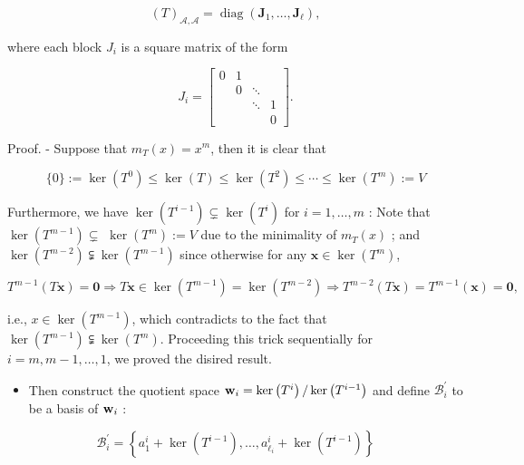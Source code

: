\documentclass[11pt]{article}
\begin{document}
\[
{\left( T\right) }_{\mathcal{A},\mathcal{A}} = \operatorname{diag}\left( {{\mathbf{J}}_1,\ldots ,{\mathbf{J}}_{\ell }}\right) ,
\]

where each block \({J}_{i}\) is a square matrix of the form

\[
{J}_{i} = \left\lbrack  \begin{matrix} 0 & 1 & & \\   & 0 &  \ddots  & \\   & &  \ddots  & 1 \\   & & & 0 \end{matrix}\right\rbrack  .
\]

Proof. - Suppose that \({m}_{T}\left( x\right)  = {x}^{m}\), then it is clear that

\[
\{ 0\}  \mathrel{\text{ := }} \ker \left( {T}^{0}\right)  \leq  \ker \left( T\right)  \leq  \ker \left( {T}^2\right)  \leq  \cdots  \leq  \ker \left( {T}^{m}\right)  \mathrel{\text{ := }} V
\]

Furthermore, we have \(\ker \left( {T}^{i - 1}\right)  \subsetneq  \ker \left( {T}^{i}\right)\) for \(i = 1,\ldots ,m\) : Note that \(\ker \left( {T}^{m - 1}\right)  \subsetneq\)  \(\ker \left( {T}^{m}\right)  \mathrel{\text{ := }} V\) due to the minimality of \({m}_{T}\left( x\right)\) ; and \(\ker \left( {T}^{m - 2}\right)  \subsetneqq  \ker \left( {T}^{m - 1}\right)\) since otherwise for any \(\mathbf{x} \in  \ker \left( {T}^{m}\right)\),

\[
{T}^{m - 1}\left( {T\mathbf{x}}\right)  = \mathbf{0} \Rightarrow  T\mathbf{x} \in  \ker \left( {T}^{m - 1}\right)  = \ker \left( {T}^{m - 2}\right)  \Rightarrow  {T}^{m - 2}\left( {T\mathbf{x}}\right)  = {T}^{m - 1}\left( \mathbf{x}\right)  = \mathbf{0},
\]

i.e., \(x \in  \ker \left( {T}^{m - 1}\right)\), which contradicts to the fact that \(\ker \left( {T}^{m - 1}\right)  \subsetneqq  \ker \left( {T}^{m}\right)\). Proceeding this trick sequentially for \(i = m,m - 1,\ldots ,1\), we proved the disired result.

\begin{itemize}
\item Then construct the quotient space \({\bf w}_{i} = \ker \left( {T}^{i}\right) /\ker \left( {T}^{i - 1}\right)\) and define \({\mathcal{B}}_{i}^{\prime }\) to be a basis of \({\bf w}_{i}\) :
\end{itemize}

\[
{\mathcal{B}}_{i}^{\prime } = \left\{  {{a}_1^{i} + \ker \left( {T}^{i - 1}\right) ,\ldots ,{a}_{{\ell }_{i}}^{i} + \ker \left( {T}^{i - 1}\right) }\right\}
\]
\end{document}
